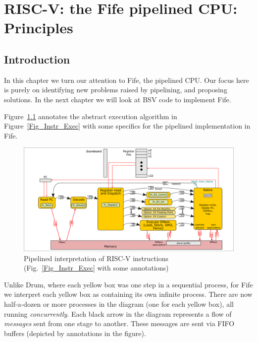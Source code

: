 

\chapter{RISC-V: the Fife pipelined CPU: Principles}


\setcounter{page}{1}
\renewcommand{\thepage}{\arabic{chapter}-\arabic{page}}

\label{ch_Fife_Principles}


\section{Introduction}

In this chapter we turn our attention to Fife, the pipelined CPU.  Our
focus here is purely on identifying new problems raised by pipelining,
and proposing solutions.  In the next chapter we will look at BSV code
to implement Fife.

Figure~\ref{Fig_Instr_Exec_w_FIFOs} annotates the abstract execution
algorithm in Figure~\ref{Fig_Instr_Exec} with some specifics for the
pipelined implementation in Fife.
\begin{figure}[htbp]
  \centerline{\includegraphics[width=6in,angle=0]{Figures/Fig_Instr_Exec_w_FIFOs}}
  \caption{\label{Fig_Instr_Exec_w_FIFOs}Pipelined interpretation of RISC-V instructions (Fig.~\ref{Fig_Instr_Exec} with some annotations)}
\end{figure}
Unlike Drum, where each yellow box was one step in a sequential
process, for Fife we interpret each yellow box as containing its own
infinite process.  There are now half-a-dozen or more processes in the
diagram (one for each yellow box), all running \emph{concurrently}.
Each black arrow in the diagram represents a flow of \emph{messages}
sent from one stage to another.  These messages are sent via FIFO
buffers (depicted by
annotations in the figure).

